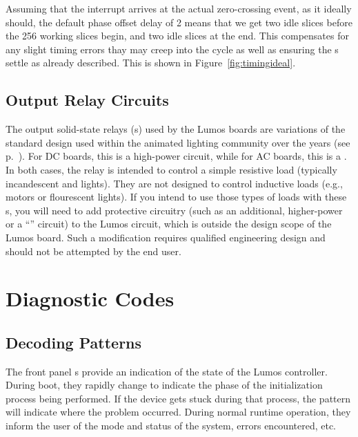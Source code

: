 \documentclass[letterpaper,twoside,onecolumn,openright,final]{memoir}
\begin{document}
Assuming that the interrupt arrives at the actual zero-crossing event, as it ideally should,
the default phase offset delay of 2 means that we get two
idle slices before the 256 working slices begin, and two idle slices at the end.  This compensates for
any slight timing errors thay may creep into the cycle as well as ensuring the s 
settle as already described.  This is shown in Figure~\ref{fig:timingideal}.


\section{Output Relay Circuits}
The output solid-state relays (s) used by the Lumos boards are variations of the standard
 design used within the  animated lighting community over the years (see p.~\pageref{sec:legacy}).  For DC boards, this is a high-power  circuit, while for AC boards, this is a .
In both cases, the relay is intended to control a simple resistive load 
(typically incandescent and 
lights).  They are not designed to control inductive loads (e.g., motors or flourescent lights).  If you intend
to use those types of loads with these s, you will need to add protective circuitry (such as an
additional, higher-power  or a ``'' circuit) to the Lumos circuit, which is outside the
design scope of the Lumos board.  Such a modification requires qualified engineering design and should not be
attempted by the end user.

%

\backmatter
\appendix
\renewcommand\thechapter{A}

\chapter{Diagnostic Codes}
\section{Decoding  Patterns}
The front panel s provide an indication of the state of the Lumos controller.
During boot, they rapidly change to indicate the phase of the initialization process being
performed.  If the device gets stuck during that process, the  pattern will indicate
where the problem occurred.  During normal runtime operation, they inform the user of the
mode and status of the system, errors encountered, etc.
\end{document}
